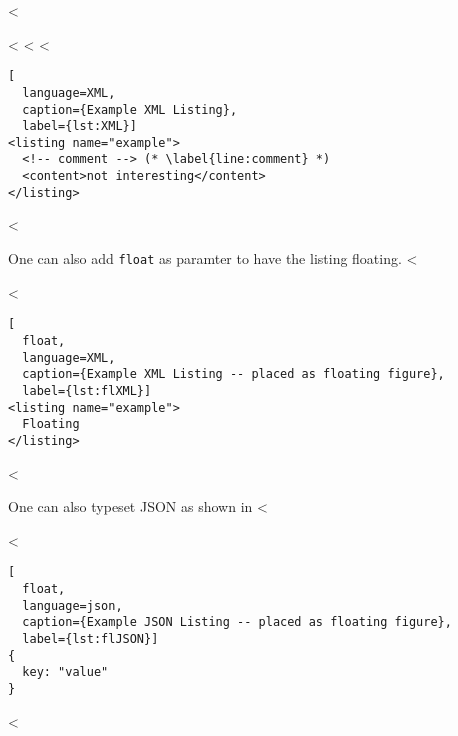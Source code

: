 <%

<%
<%
<%

\begin{lstlisting}[
  language=XML,
  caption={Example XML Listing},
  label={lst:XML}]
<listing name="example">
  <!-- comment --> (* \label{line:comment} *)
  <content>not interesting</content>
</listing>
\end{lstlisting}
<%

One can also add \verb+float+ as paramter to have the listing floating.
<%

<%
\begin{lstlisting}[
  float,
  language=XML,
  caption={Example XML Listing -- placed as floating figure},
  label={lst:flXML}]
<listing name="example">
  Floating
</listing>
\end{lstlisting}
<%

One can also typeset JSON as shown in <%

<%
\begin{lstlisting}[
  float,
  language=json,
  caption={Example JSON Listing -- placed as floating figure},
  label={lst:flJSON}]
{
  key: "value"
}
\end{lstlisting}
<%
